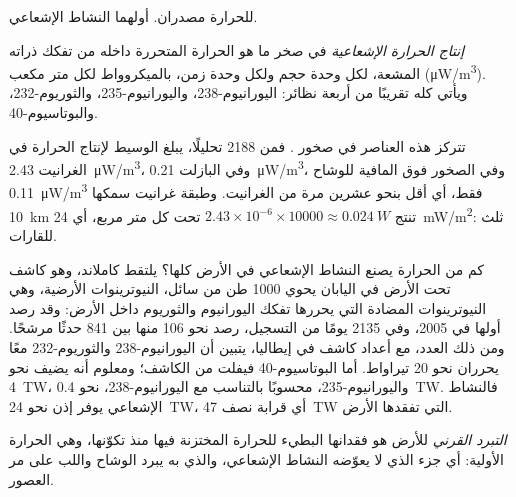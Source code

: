 للحرارة مصدران. أولهما النشاط الإشعاعي.

\begin{definition}\label{def:g12:internal-heat:heat-production}
\emph{إنتاج الحرارة الإشعاعية} في
صخر ما هو الحرارة المتحررة داخله من تفكك ذراته المشعة،
لكل وحدة حجم ولكل وحدة زمن، بالميكروواط لكل متر مكعب
(\unit{\micro W/m^3}). ويأتي كله تقريبًا من أربعة نظائر: اليورانيوم-238،
واليورانيوم-235، والثوريوم-232، والبوتاسيوم-40.
\end{definition}

تتركز هذه العناصر في صخور . فمن
2188 تحليلًا، يبلغ الوسيط لإنتاج الحرارة في الغرانيت
\qty{2.43}{\micro W/m^3}، وفي البازلت \qty{0.21}{\micro W/m^3}، وفي
الصخور فوق المافية للوشاح \qty{0.11}{\micro W/m^3} فقط، أي أقل بنحو عشرين
مرة من الغرانيت. وطبقة غرانيت سمكها \qty{10}{km} تنتج
$2.43 \times 10^{-6} \times \num{10000} \approx \qty{0.024}{W}$ تحت كل
متر مربع، أي \qty{24}{mW/m^2}: ثلث  للقارات.

كم من الحرارة يصنع النشاط الإشعاعي في الأرض كلها؟ يلتقط كاملاند، وهو
كاشف تحت الأرض في اليابان يحوي 1000 طن من سائل،
النيوترينوات الأرضية، وهي النيوترينوات المضادة التي يحررها تفكك اليورانيوم والثوريوم
داخل الأرض: وقد رصد أولها في 2005، وفي 2135 يومًا من
التسجيل، رصد نحو 106 منها بين 841 حدثًا مرشحًا. ومن ذلك العدد،
مع أعداد كاشف في إيطاليا، يتبين أن اليورانيوم-238 والثوريوم-232 معًا
يحرران نحو 20 تيراواط. أما البوتاسيوم-40 فيفلت من الكاشف؛ ومعلوم
أنه يضيف نحو \qty{4}{TW}، واليورانيوم-235، محسوبًا بالتناسب مع اليورانيوم-238، نحو
\qty{0.4}{TW}. فالنشاط الإشعاعي يوفر إذن نحو \qty{24}{TW}،
أي قرابة نصف \qty{47}{TW} التي تفقدها الأرض.

\begin{definition}\label{def:g12:internal-heat:secular-cooling}
\emph{التبرد القرني} للأرض هو فقدانها البطيء
للحرارة المختزنة فيها منذ تكوّنها، وهي الحرارة الأولية: أي
جزء  الذي لا يعوّضه النشاط الإشعاعي، والذي به يبرد
الوشاح واللب على مر العصور.
\end{definition}


